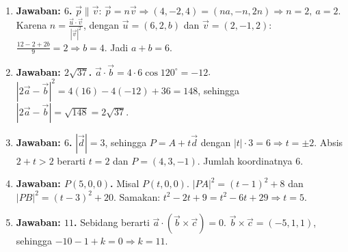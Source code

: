 \documentclass[a4paper,11pt]{article}
\newcommand{\dis}{\displaystyle}
\newcounter{no}
\begin{document}
\small\begin{enumerate}[leftmargin=2em,itemsep=2pt,topsep=2pt]
\item[\textbf{1.}] \textbf{Jawaban: $6$.} $\vec p\parallel\vec v$: $\vec p=n\vec v\Rightarrow(4,-2,4)=(na,-n,2n)\Rightarrow n=2,\ a=2$. Karena $n=\dis\frac{\vec u\cdot\vec v}{|\vec v|^{2}}$, dengan $\vec u=(6,2,b)$ dan $\vec v=(2,-1,2)$: $\dis\frac{12-2+2b}{9}=2\Rightarrow b=4$. Jadi $a+b=6$.
\item[\textbf{2.}] \textbf{Jawaban: $2\sqrt{37}$.} $\vec a\cdot\vec b=4\cdot6\cos120^\circ=-12$. $|2\vec a-\vec b|^{2}=4(16)-4(-12)+36=148$, sehingga $|2\vec a-\vec b|=\sqrt{148}=2\sqrt{37}$.
\item[\textbf{3.}] \textbf{Jawaban: $6$.} $|\vec d|=3$, sehingga $P=A+t\vec d$ dengan $|t|\cdot3=6\Rightarrow t=\pm2$. Absis $2+t>2$ berarti $t=2$ dan $P=(4,3,-1)$. Jumlah koordinatnya $6$.
\item[\textbf{4.}] \textbf{Jawaban: $P(5,0,0)$.} Misal $P(t,0,0)$. $|PA|^{2}=(t-1)^{2}+8$ dan $|PB|^{2}=(t-3)^{2}+20$. Samakan: $t^{2}-2t+9=t^{2}-6t+29\Rightarrow t=5$.
\item[\textbf{5.}] \textbf{Jawaban: $11$.} Sebidang berarti $\vec a\cdot(\vec b\times\vec c)=0$. $\vec b\times\vec c=(-5,1,1)$, sehingga $-10-1+k=0\Rightarrow k=11$.
\end{enumerate}
\par{}\par\vspace{0.2em}
\end{document}
